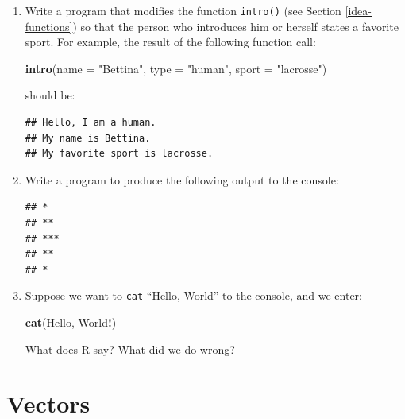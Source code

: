 \documentclass[]{book}
\makeatletter
\newenvironment{Shaded}{\begin{snugshade}}{\end{snugshade}}
\newcommand{\KeywordTok}[1]{\textcolor[rgb]{0.13,0.29,0.53}{\textbf{#1}}}
\newcommand{\DataTypeTok}[1]{\textcolor[rgb]{0.13,0.29,0.53}{#1}}
\newcommand{\StringTok}[1]{\textcolor[rgb]{0.31,0.60,0.02}{#1}}
\newcommand{\OperatorTok}[1]{\textcolor[rgb]{0.81,0.36,0.00}{\textbf{#1}}}
\newcommand{\NormalTok}[1]{#1}
\newenvironment{kframe}{%
\medskip{}
\setlength{\fboxsep}{.8em}
 \def\at@end@of@kframe{}%
 \ifinner\ifhmode%
  \def\at@end@of@kframe{\end{minipage}}%
  \begin{minipage}{\columnwidth}%
 \fi\fi%
 \def\FrameCommand##1{\hskip\@totalleftmargin \hskip-\fboxsep
 \colorbox{shadecolor}{##1}\hskip-\fboxsep
     \hskip-\linewidth \hskip-\@totalleftmargin \hskip\columnwidth}%
 \MakeFramed {\advance\hsize-\width
   \@totalleftmargin\z@ \linewidth\hsize
   \@setminipage}}%
 {\par\unskip\endMakeFramed%
 \at@end@of@kframe}
\renewenvironment{Shaded}{\begin{kframe}}{\end{kframe}}
\theoremstyle{definition}
\theoremstyle{definition}
\theoremstyle{definition}
\theoremstyle{remark}
\makeatother
\begin{document}
\begin{enumerate}
\def\labelenumi{\arabic{enumi}.}
\item
  Write a program that modifies the function \texttt{intro()} (see
  Section \ref{idea-functions}) so that the person who introduces him or
  herself states a favorite sport. For example, the result of the
  following function call:

\begin{Shaded}
\begin{Highlighting}[]
\KeywordTok{intro}\NormalTok{(}\DataTypeTok{name =} \StringTok{"Bettina"}\NormalTok{, }\DataTypeTok{type =} \StringTok{"human"}\NormalTok{, }\DataTypeTok{sport =} \StringTok{"lacrosse"}\NormalTok{)}
\end{Highlighting}
\end{Shaded}

  should be:

\begin{verbatim}
## Hello, I am a human.  
## My name is Bettina.
## My favorite sport is lacrosse.
\end{verbatim}
\item
  Write a program to produce the following output to the console:

\begin{verbatim}
## *
## **
## ***
## **
## *
\end{verbatim}
\item
  Suppose we want to \texttt{cat} ``Hello, World'' to the console, and
  we enter:

\begin{Shaded}
\begin{Highlighting}[]
\KeywordTok{cat}\NormalTok{(Hello, World}\OperatorTok{!}\NormalTok{)}
\end{Highlighting}
\end{Shaded}

  What does R say? What did we do wrong?
\end{enumerate}

\chapter{Vectors}\label{vectors}
\end{document}
